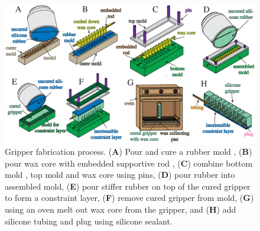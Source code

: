 \begin{figure}[htb]
\centering
   \includegraphics[width=0.98\columnwidth]{figures/robotic_gripper/fabrication_new.eps} %
      \caption{Gripper fabrication process. (\textbf{A}) Pour and cure a rubber mold , (\textbf{B}) pour wax core  with embedded supportive rod , (\textbf{C}) combine bottom mold , top mold  and wax core using pins, (\textbf{D}) pour  rubber  into assembled mold, (\textbf{E}) pour stiffer rubber  on top of the cured gripper  to form a constraint layer, (\textbf{F}) remove cured gripper from mold, (\textbf{G}) using an oven melt out wax core from the gripper, and (\textbf{H}) add silicone tubing and plug using silicone sealant. }
      \label{fig:fabrication}
\end{figure}

